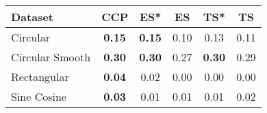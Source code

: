 \begin{tabular}{lccccc}
\toprule
Dataset & CCP & ES* & ES & TS* & TS \\
\midrule
Circular & \textbf{0.15} & \textbf{0.15} & 0.10 & 0.13 & 0.11 \\
Circular Smooth & \textbf{0.30} & \textbf{0.30} & 0.27 & \textbf{0.30} & 0.29 \\
Rectangular & \textbf{0.04} & 0.02 & 0.00 & 0.00 & 0.00 \\
Sine Cosine & \textbf{0.03} & 0.01 & 0.01 & 0.01 & 0.02 \\
\bottomrule
\end{tabular}